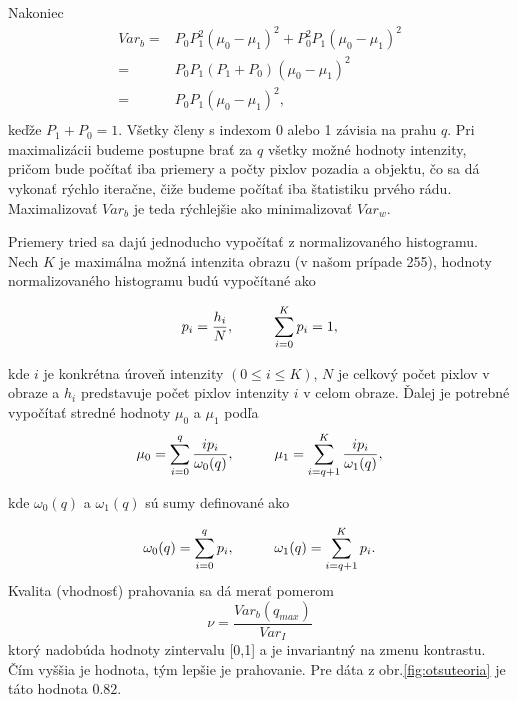 \documentclass[a4paper,11pt,oneside]{article}%
\begin{document}
Nakoniec
\begin{equation}
\begin{aligned}
Var_b= & P_0 P_1^2(\mu_0-\mu_1 )^2+P_0^2 P_1(\mu_0-\mu_1 )^2 \\
     = & P_0 P_1(P_1 + P_0)(\mu_0-\mu_1 )^2 \\
      = & P_0 P_1(\mu_0-\mu_1 )^2, \\
\end{aligned}
\end{equation}
keďže $ P_1 + P_0=1 $.
Všetky členy s indexom 0 alebo 1 závisia na prahu $ q $. Pri maximalizácii budeme postupne brať za  $ q $ všetky možné hodnoty intenzity, pričom bude počítať iba priemery a počty pixlov pozadia a objektu, čo sa dá vykonať rýchlo iteračne, čiže budeme počítať iba štatistiku prvého rádu. Maximalizovať $ Var_b $ je teda rýchlejšie
ako minimalizovať $ Var_w $.

Priemery tried sa dajú jednoducho vypočítať z normalizovaného histogramu. Nech $K$ je maximálna možná intenzita obrazu (v našom prípade 255), hodnoty normalizovaného histogramu  budú vypočítané ako

\begin{equation}
p_i = \frac{h_i}{N}, \hspace{10mm}  \sum_{i=0}^{K} p_i = 1,
\end{equation}

kde $i$ je konkrétna úroveň intenzity $(0 \leq i \leq K)$, $N$ je celkový počet pixlov v obraze a $h_i$ predstavuje počet pixlov intenzity $ i $ v celom obraze. Ďalej je potrebné vypočítať stredné hodnoty $\mu_0$ a $\mu_1$ podľa 
\begin{equation}
\mu_0 =  \sum_{i=0}^{q}\frac{i p_i}{\omega_0(q)}, \hspace{10mm} \mu_1 =  \sum_{i=q + 1}^{K}\frac{i p_i}{\omega_1(q)},
\end{equation}

kde $\omega_0(q)$ a $\omega_1(q)$ sú sumy definované ako

\begin{equation}
\omega_0(q) = \sum_{i=0}^{q} p_i, \hspace{10mm} \omega_1(q) =  \sum_{i=q + 1}^{K} p_i.
\end{equation}
Kvalita (vhodnosť) prahovania sa dá merať pomerom
\begin{equation}
\nu  = \frac{Var_b(q_{max})}{Var_I} 
\end{equation}
ktorý nadobúda hodnoty zintervalu [0,1] a je invariantný na zmenu kontrastu. Čím vyššia je hodnota, tým lepšie je prahovanie. Pre dáta z obr.\ref{fig:otsuteoria} je táto hodnota $ 0.82 $.
 
\end{document}
